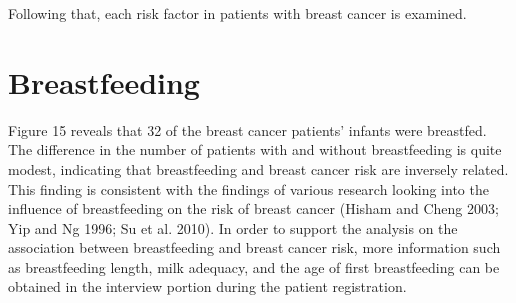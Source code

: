 \documentclass[10pt,a4paper,twoside]{article}
\begin{document}
Following that, each risk factor in patients with breast cancer is examined.

\section{Breastfeeding}

Figure 15 reveals that 32 of the breast cancer patients' infants were breastfed. The difference in the number of patients with and without breastfeeding is quite modest, indicating that breastfeeding and breast cancer risk are inversely related. This finding is consistent with the findings of various research looking into the influence of breastfeeding on the risk of breast cancer (Hisham and Cheng 2003; Yip and Ng 1996; Su et al. 2010). In order to support the analysis on the association between breastfeeding and breast cancer risk, more information such as breastfeeding length, milk adequacy, and the age of first breastfeeding can be obtained in the interview portion during the patient registration.
\end{document}

